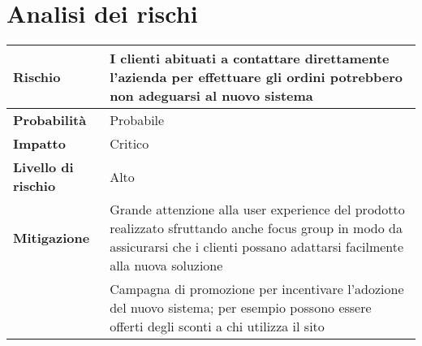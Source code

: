 \chapter{Analisi dei rischi}
\label{app:analisi-rischi}

\begin{table}[H]
  \begin{tabularx}{\textwidth}{lX}
    \toprule
    \textbf{Rischio}            & \textbf{I clienti abituati a contattare direttamente l'azienda per effettuare gli ordini potrebbero non adeguarsi al nuovo sistema}                                                \\
    \midrule
    \textbf{Probabilità}        & Probabile                                                                                                                                                                          \\
    \textbf{Impatto}            & Critico                                                                                                                                                                            \\
    \textbf{Livello di rischio} & Alto                                                                                                                                                                               \\
    \textbf{Mitigazione}        & Grande attenzione alla user experience del prodotto realizzato sfruttando anche focus group in modo da assicurarsi che i clienti possano adattarsi facilmente alla nuova soluzione \\
                                & Campagna di promozione per incentivare l'adozione del nuovo sistema; per esempio possono essere offerti degli sconti a chi utilizza il sito                                        \\
    \bottomrule
  \end{tabularx}
\end{table}

